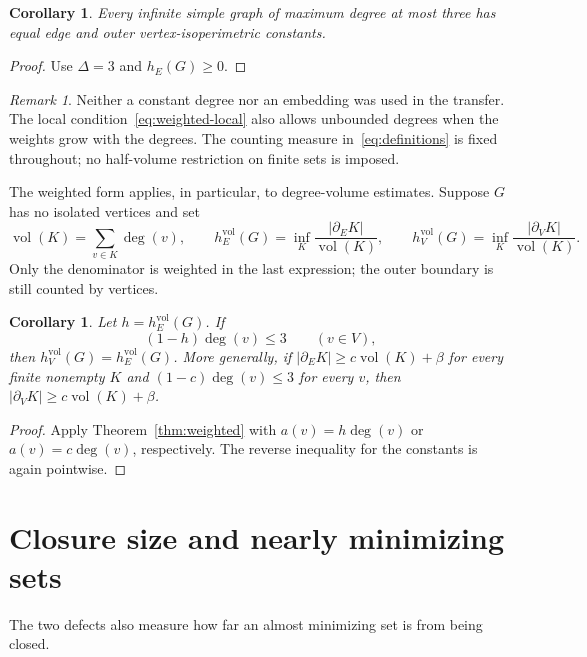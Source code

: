 \documentclass[11pt]{amsart}
\numberwithin{equation}{section}
\newtheorem{corollary}[theorem]{Corollary}
\theoremstyle{definition}
\theoremstyle{remark}
\newtheorem{remark}[theorem]{Remark}
\newcommand{\hE}{h_E}
\newcommand{\hV}{h_V}
\newcommand{\bE}{\partial_E}
\newcommand{\bV}{\partial_V}
\newcommand{\vol}{\operatorname{vol}}
\begin{document}
\begin{corollary}\label{cor:subcubic}
Every infinite simple graph of maximum degree at most three has equal edge and outer vertex-isoperimetric constants.
\end{corollary}
\begin{proof}
Use $\Delta=3$ and $\hE(G)\ge0$.
\end{proof}

\begin{remark}
Neither a constant degree nor an embedding was used in the transfer. The local condition~\eqref{eq:weighted-local} also allows unbounded degrees when the weights grow with the degrees. The counting measure in~\eqref{eq:definitions} is fixed throughout; no half-volume restriction on finite sets is imposed.
\end{remark}

The weighted form applies, in particular, to degree-volume estimates. Suppose $G$ has no isolated vertices and set
\[
\vol(K)=\sum_{v\in K}\deg(v),\qquad
\hE^{\mathrm{vol}}(G)=\inf_K\frac{|\bE K|}{\vol(K)},\qquad
\hV^{\mathrm{vol}}(G)=\inf_K\frac{|\bV K|}{\vol(K)}.
\]
Only the denominator is weighted in the last expression; the outer boundary is still counted by vertices.

\begin{corollary}\label{cor:volume}
Let $h=\hE^{\mathrm{vol}}(G)$. If
\begin{equation}\label{eq:volume-threshold}
(1-h)\deg(v)\le3\qquad(v\in V),
\end{equation}
then $\hV^{\mathrm{vol}}(G)=\hE^{\mathrm{vol}}(G)$. More generally, if $|\bE K|\ge c\vol(K)+\beta$ for every finite nonempty $K$ and $(1-c)\deg(v)\le3$ for every $v$, then $|\bV K|\ge c\vol(K)+\beta$.
\end{corollary}
\begin{proof}
Apply Theorem~\ref{thm:weighted} with $a(v)=h\deg(v)$ or $a(v)=c\deg(v)$, respectively. The reverse inequality for the constants is again pointwise.
\end{proof}

\section{Closure size and nearly minimizing sets}\label{sec:stability}
The two defects also measure how far an almost minimizing set is from being closed.
\end{document}
